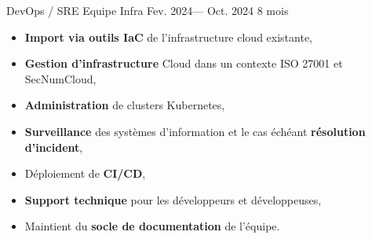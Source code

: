 \jobposition%
{DevOps / SRE}%
{Equipe Infra}%
{Fev. 2024--- Oct. 2024}%
{8 mois}%
{
	\begin{itemize}
	  \item \textbf{Import via outils IaC} de l'infrastructure cloud existante,
		\item \textbf{Gestion d'infrastructure} Cloud dans un contexte ISO 27001 et
		      SecNumCloud,
		\item \textbf{Administration} de clusters Kubernetes,
		\item \textbf{Surveillance} des systèmes d'information et le cas échéant
		      \textbf{résolution d'incident},
		\item Déploiement de \textbf{CI/CD},
		\item \textbf{Support technique} pour les développeurs et développeuses,
		\item Maintient du \textbf{socle de documentation} de l'équipe.
	\end{itemize}
}
